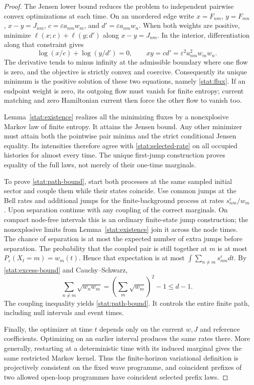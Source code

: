 \documentclass[11pt,oneside,openany]{book}
\theoremstyle{definition}
\theoremstyle{remark}\newtheorem{remark}[theorem]{Remark}
\begin{document}
\begin{proof}
The Jensen lower bound reduces the problem to independent pairwise convex
optimizations at each time. On an unordered edge write $x=F_{nm}$,
$y=F_{mn}$, $x-y=J_{nm}$, $c=\varepsilon a_{nm}w_m$, and
$d'=\varepsilon a_{nm}w_n$. When both weights are positive, minimize
$\ell(x;c)+\ell(y;d')$ along $x-y=J_{nm}$. In the interior, differentiation
along that constraint gives
\[
 \log(x/c)+\log(y/d')=0,
 \qquad xy=cd'=\varepsilon^2a_{nm}^2w_mw_n.
\]
The derivative tends to minus infinity at the admissible boundary where
one flow is zero, and the objective is strictly convex and coercive.
Consequently its unique minimum is the positive solution of these two
equations, namely \eqref{stat:flux}. If an endpoint weight is zero, its
outgoing flow must vanish for finite entropy; current matching and zero
Hamiltonian current then force the other flow to vanish too.

Lemma~\ref{stat:existence} realizes all the minimizing fluxes by a
nonexplosive Markov law of finite entropy. It attains the Jensen bound.
Any other minimizer must attain both the pointwise pair minima and the
strict conditional Jensen equality. Its intensities therefore agree with
\eqref{stat:selected-rate} on all occupied histories for almost every
time. The unique first-jump construction proves equality of the full laws,
not merely of their one-time marginals.

To prove \eqref{stat:path-bound}, start both processes at the same sampled
initial sector and couple them while their states coincide. Use common
jumps at the Bell rates and additional jumps for the finite-background
process at rates $s^\varepsilon_{nm}/w_m$. Upon separation continue with
any coupling of the correct marginals. On compact node-free intervals this
is an ordinary finite-state jump construction; the nonexplosive limits
from Lemma~\ref{stat:existence} join it across the node times. The chance of
separation is at most the expected number of extra jumps before separation.
The probability that the coupled pair is still together at $m$ is at most
$P_\varepsilon(X_t=m)=w_m(t)$. Hence that expectation is at most
$\int\sum_{n\ne m}s^\varepsilon_{nm}dt$. By
\eqref{stat:excess-bound} and Cauchy--Schwarz,
\[
 \sum_{n\ne m}\sqrt{w_nw_m}
       =\left(\sum_m\sqrt{w_m}\right)^2-1\leq d-1.
\]
The coupling inequality yields \eqref{stat:path-bound}. It controls the
entire finite path, including null intervals and event times.

Finally, the optimizer at time $t$ depends only on the current $w,J$ and
reference coefficients. Optimizing on an earlier interval produces the
same rates there. More generally, restarting at a deterministic time with
its induced marginal gives the same restricted Markov kernel. Thus the
finite-horizon variational definition is projectively consistent on the
fixed wave programme, and coincident prefixes of two allowed open-loop
programmes have coincident selected prefix laws.
\end{proof}
\end{document}
